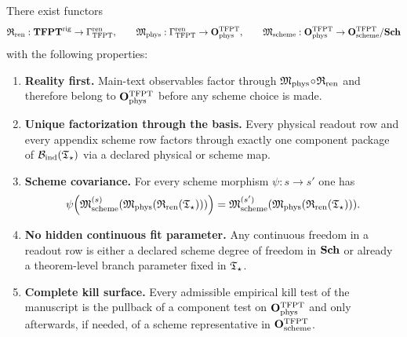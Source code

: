 \begin{theorem}
\label{thm:operational-completeness}
There exist functors
\[
\mathfrak R_{\mathrm{ren}}:\mathbf{TFPT}^{\mathrm{rig}}\to\Gamma_{\mathrm{TFPT}}^{\mathrm{ren}},
\qquad
\mathfrak M_{\mathrm{phys}}:\Gamma_{\mathrm{TFPT}}^{\mathrm{ren}}\to\mathbf O_{\mathrm{phys}}^{\mathrm{TFPT}},
\qquad
\mathfrak M_{\mathrm{scheme}}:\mathbf O_{\mathrm{phys}}^{\mathrm{TFPT}}\to\mathbf O_{\mathrm{scheme}}^{\mathrm{TFPT}}/\mathbf{Sch}
\]
with the following properties:
\begin{enumerate}[label=\textbf{(O\arabic*)}, leftmargin=2em, topsep=3pt, itemsep=3pt]
    \item \textbf{Reality first.}
    Main-text observables factor through $\mathfrak M_{\mathrm{phys}}\!\circ\!\mathfrak R_{\mathrm{ren}}$ and therefore belong to
    $\mathbf O_{\mathrm{phys}}^{\mathrm{TFPT}}$ before any scheme choice is made.
    \item \textbf{Unique factorization through the basis.}
    Every physical readout row and every appendix scheme row factors through exactly one component
    package of $\mathcal B_{\mathrm{ind}}(\mathfrak T_{\star})$ via a declared physical or scheme map.
    \item \textbf{Scheme covariance.}
    For every scheme morphism $\psi:s\to s'$ one has
    \[
    \psi\!\left(\mathfrak M_{\mathrm{scheme}}^{(s)}(\mathfrak M_{\mathrm{phys}}(\mathfrak R_{\mathrm{ren}}(\mathfrak T_{\star})))\right)
    =
    \mathfrak M_{\mathrm{scheme}}^{(s')}(\mathfrak M_{\mathrm{phys}}(\mathfrak R_{\mathrm{ren}}(\mathfrak T_{\star}))).
    \]
    \item \textbf{No hidden continuous fit parameter.}
    Any continuous freedom in a readout row is either a declared scheme degree of freedom in
    $\mathbf{Sch}$ or already a theorem-level branch parameter fixed in $\mathfrak T_{\star}$.
    \item \textbf{Complete kill surface.}
    Every admissible empirical kill test of the manuscript is the pullback of a component test on
    $\mathbf O_{\mathrm{phys}}^{\mathrm{TFPT}}$ and only afterwards, if needed, of a scheme representative in $\mathbf O_{\mathrm{scheme}}^{\mathrm{TFPT}}$.
\end{enumerate}
\end{theorem}

